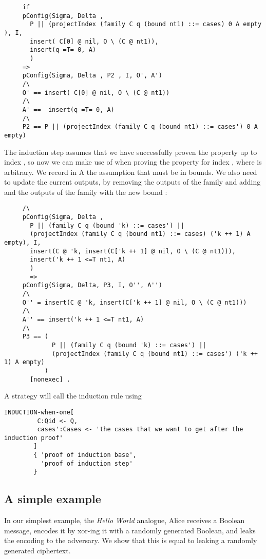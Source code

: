 \begin{lstlisting}
     if 
     pConfig(Sigma, Delta , 
       P || (projectIndex (family C q (bound nt1) ::= cases) 0 A empty ), I, 
       insert( C[0] @ nil, O \ (C @ nt1)), 
       insert(q =T= 0, A)
       ) 
     => 
     pConfig(Sigma, Delta , P2 , I, O', A')
     /\
     O' == insert( C[0] @ nil, O \ (C @ nt1))
     /\
     A' ==  insert(q =T= 0, A) 
     /\
     P2 == P || (projectIndex (family C q (bound nt1) ::= cases') 0 A empty)
\end{lstlisting}
The induction step assumes that we have successfully proven the 
property up to index , so now we can
make use of  when proving the
property for index , where \code{'k} is arbitrary.
We record in A the assumption that \code{'k + 1} must be in bounds. 
We also need to update the current outputs, by removing the outputs of the family  and adding  and the outputs of the family  with the new bound :
\begin{lstlisting}     
     /\
     pConfig(Sigma, Delta , 
       P || (family C q (bound 'k) ::= cases') || 
       (projectIndex (family C q (bound nt1) ::= cases) ('k ++ 1) A empty), I, 
       insert(C @ 'k, insert(C['k ++ 1] @ nil, O \ (C @ nt1))), 
       insert('k ++ 1 <=T nt1, A)
       )
       =>
     pConfig(Sigma, Delta, P3, I, O'', A'')
     /\
     O'' = insert(C @ 'k, insert(C['k ++ 1] @ nil, O \ (C @ nt1)))
     /\
     A'' == insert('k ++ 1 <=T nt1, A) 
     /\
     P3 == (
             P || (family C q (bound 'k) ::= cases') ||
             (projectIndex (family C q (bound nt1) ::= cases') ('k ++ 1) A empty)
           )
       [nonexec] . 
\end{lstlisting}

A strategy will call the induction rule using
\begin{lstlisting}
INDUCTION-when-one[
         C:Qid <- Q, 
         cases':Cases <- 'the cases that we want to get after the induction proof'
        ]
        { 'proof of induction base',
          'proof of induction step'        
        }
\end{lstlisting}

\subsection{A simple example}

In our simplest example, the \ipdl \emph{Hello World} analogue, Alice receives a Boolean message, encodes it by xor-ing it with a randomly generated Boolean, and leaks the encoding to the adversary. We show that this is equal to leaking a randomly generated ciphertext.

